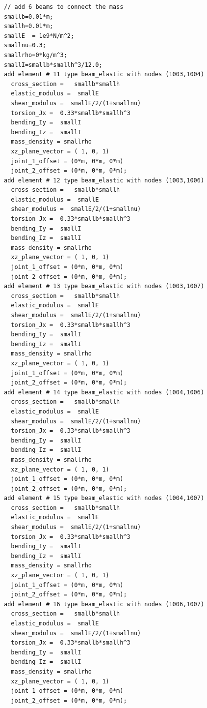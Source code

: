 \documentclass[fleqn,11pt]{article}
\begin{document}
\begin{lstlisting}
// add 6 beams to connect the mass 
smallb=0.01*m;
smallh=0.01*m;
smallE  = 1e9*N/m^2; 
smallnu=0.3;
smallrho=0*kg/m^3;
smallI=smallb*smallh^3/12.0;
add element # 11 type beam_elastic with nodes (1003,1004) 
  cross_section =   smallb*smallh 
  elastic_modulus =  smallE
  shear_modulus =  smallE/2/(1+smallnu)
  torsion_Jx =  0.33*smallb*smallh^3
  bending_Iy =  smallI
  bending_Iz =  smallI
  mass_density = smallrho
  xz_plane_vector = ( 1, 0, 1) 
  joint_1_offset = (0*m, 0*m, 0*m) 
  joint_2_offset = (0*m, 0*m, 0*m);
add element # 12 type beam_elastic with nodes (1003,1006) 
  cross_section =   smallb*smallh 
  elastic_modulus =  smallE
  shear_modulus =  smallE/2/(1+smallnu)
  torsion_Jx =  0.33*smallb*smallh^3
  bending_Iy =  smallI
  bending_Iz =  smallI
  mass_density = smallrho
  xz_plane_vector = ( 1, 0, 1) 
  joint_1_offset = (0*m, 0*m, 0*m) 
  joint_2_offset = (0*m, 0*m, 0*m);
add element # 13 type beam_elastic with nodes (1003,1007) 
  cross_section =   smallb*smallh 
  elastic_modulus =  smallE
  shear_modulus =  smallE/2/(1+smallnu)
  torsion_Jx =  0.33*smallb*smallh^3
  bending_Iy =  smallI
  bending_Iz =  smallI
  mass_density = smallrho
  xz_plane_vector = ( 1, 0, 1) 
  joint_1_offset = (0*m, 0*m, 0*m) 
  joint_2_offset = (0*m, 0*m, 0*m);
add element # 14 type beam_elastic with nodes (1004,1006) 
  cross_section =   smallb*smallh 
  elastic_modulus =  smallE
  shear_modulus =  smallE/2/(1+smallnu)
  torsion_Jx =  0.33*smallb*smallh^3
  bending_Iy =  smallI
  bending_Iz =  smallI
  mass_density = smallrho
  xz_plane_vector = ( 1, 0, 1) 
  joint_1_offset = (0*m, 0*m, 0*m) 
  joint_2_offset = (0*m, 0*m, 0*m);
add element # 15 type beam_elastic with nodes (1004,1007) 
  cross_section =   smallb*smallh 
  elastic_modulus =  smallE
  shear_modulus =  smallE/2/(1+smallnu)
  torsion_Jx =  0.33*smallb*smallh^3
  bending_Iy =  smallI
  bending_Iz =  smallI
  mass_density = smallrho
  xz_plane_vector = ( 1, 0, 1) 
  joint_1_offset = (0*m, 0*m, 0*m) 
  joint_2_offset = (0*m, 0*m, 0*m);
add element # 16 type beam_elastic with nodes (1006,1007) 
  cross_section =   smallb*smallh 
  elastic_modulus =  smallE
  shear_modulus =  smallE/2/(1+smallnu)
  torsion_Jx =  0.33*smallb*smallh^3
  bending_Iy =  smallI
  bending_Iz =  smallI
  mass_density = smallrho
  xz_plane_vector = ( 1, 0, 1) 
  joint_1_offset = (0*m, 0*m, 0*m) 
  joint_2_offset = (0*m, 0*m, 0*m);



\end{lstlisting}
\end{document}
